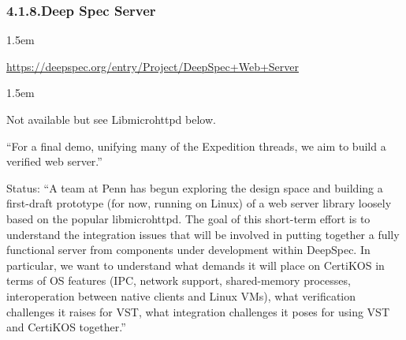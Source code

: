 \documentclass[12pt,twoside]{article}
\begin{document}
\subsubsection{4.1.8.\hspace*{0.5em}Deep Spec Server}\label{sec-deep-spec-server}%

\begin{mddefinitions}%


\begin{mdbmarginx}{}{}{}{1.5em}%
\begin{mddefdata}%
\href{https://deepspec.org/entry/Project/DeepSpec+Web+Server}{{\ttfamily https://\hspace{0pt}deepspec.\hspace{0pt}org/\hspace{0pt}entry/\hspace{0pt}Project/\hspace{0pt}DeepSpec+\hspace{0pt}Web+\hspace{0pt}Server}}
\end{mddefdata}%
\end{mdbmarginx}%


\begin{mdbmarginx}{}{}{}{1.5em}%
\begin{mddefdata}%
Not available but see Libmicrohttpd below.%
\end{mddefdata}%
\end{mdbmarginx}%
\end{mddefinitions}%

\noindent{}\textquotedblleft{}For a final demo, unifying many of the Expedition threads, we aim to
build a verified web server.\textquotedblright{}%

Status: \textquotedblleft{}A team at Penn has begun exploring the design space and
building a first-draft prototype (for now, running on Linux) of a web
server library loosely based on the popular libmicrohttpd.  The goal
of this short-term effort is to understand the integration issues that
will be involved in putting together a fully functional server from
components under development within DeepSpec.  In particular, we want
to understand what demands it will place on CertiKOS in terms of OS
features (IPC, network support, shared-memory processes,
interoperation between native clients and Linux VMs), what
verification challenges it raises for VST, what integration challenges
it poses for using VST and CertiKOS together.\textquotedblright{}%
\end{document}
